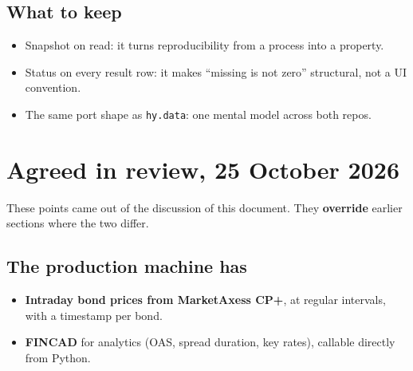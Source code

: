 \documentclass[11pt,a4paper]{article}
\newcommand{\code}[1]{\texttt{\small #1}}
\begin{document}
\subsection*{What to keep}
\begin{itemize}
\item Snapshot on read: it turns reproducibility from a process into a property.
\item Status on every result row: it makes ``missing is not zero'' structural, not a UI convention.
\item The same port shape as \code{hy.data}: one mental model across both repos.
\end{itemize}

\section{Agreed in review, 25 October 2026}\label{sec:agreed}
These points came out of the discussion of this document. They \textbf{override} earlier sections where the two differ.

\subsection{The production machine has}
\begin{itemize}
\item \textbf{Intraday bond prices from MarketAxess CP+}, at regular intervals, with a timestamp per bond.
\item \textbf{FINCAD} for analytics (OAS, spread duration, key rates), callable directly from Python.
\end{itemize}
\end{document}

